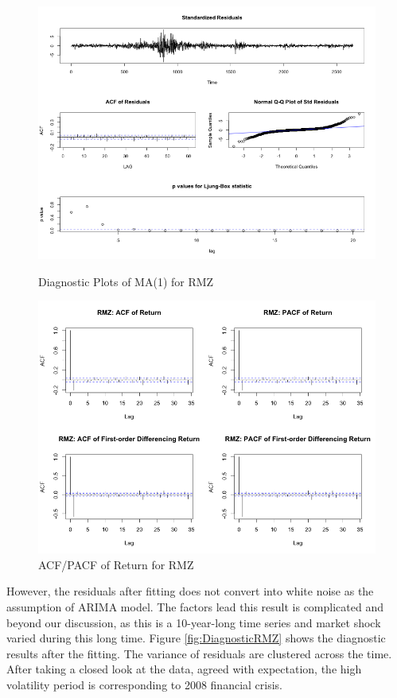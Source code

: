 \documentclass[11pt]{article}
\begin{document}
\begin{figure}[H]
  \centering
  \begin{minipage}[b]{0.48\textwidth}
  \includegraphics[width = 1\textwidth]{../results/DiagnosticRMZ}
      \caption{Diagnostic Plots of MA(1) for RMZ}
  \label{fig:DiagnosticRMZ}
  \end{minipage}
  \hfill
  \begin{minipage}[b]{0.48\textwidth}
  \includegraphics[width = 1\textwidth]{../results/ACFofRMZ}
  \caption{ACF/PACF of Return for RMZ}
  \label{fig:ACFofRMZ}
  \end{minipage}
\end{figure}
However, the residuals after fitting does not convert into white noise as the assumption of ARIMA model. The factors lead this result is complicated and beyond our discussion, as this is a 10-year-long time series and market shock varied during this long time. Figure \ref{fig:DiagnosticRMZ} shows the diagnostic results after the fitting. The variance of residuals are clustered across the time. After taking a closed look at the data, agreed with expectation, the high volatility period is corresponding to 2008 financial crisis.
\end{document}

